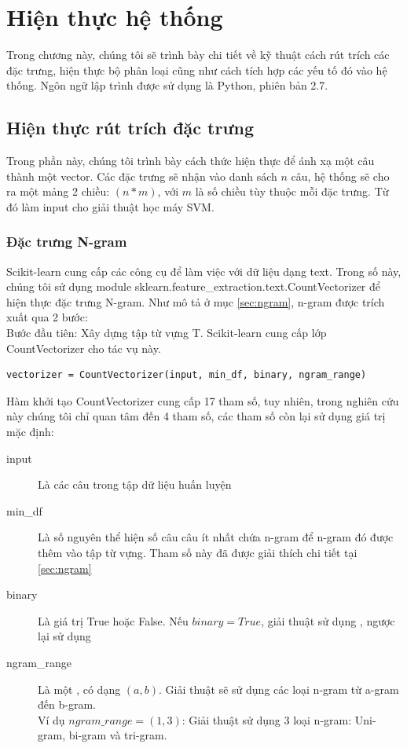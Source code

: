 \section{Hiện thực hệ thống} \label{sec:hienthuchethong}
Trong chương này, chúng tôi sẽ trình bày chi tiết về kỹ thuật cách rút trích các đặc trưng, hiện thực bộ phân loại cũng như cách tích hợp các yếu tố đó vào hệ thống. Ngôn ngữ lập trình được sử dụng là Python, phiên bản 2.7.

\subsection{Hiện thực rút trích đặc trưng}
Trong phần này, chúng tôi trình bày cách thức hiện thực để ánh xạ một câu thành một vector. Các đặc trưng sẽ nhận vào danh sách $n$ câu, hệ thống sẽ cho ra một mảng 2 chiều: $(n*m)$, với $m$ là số chiều tùy thuộc mỗi đặc trưng. Từ đó làm input cho giải thuật học máy SVM.
\subsubsection*{Đặc trưng N-gram}
Scikit-learn cung cấp các công cụ để làm việc với dữ liệu dạng text. Trong số này, chúng tôi sử dụng module sklearn.feature\_extraction.text.CountVectorizer để hiện thực đặc trưng N-gram. Như mô tả ở mục \ref{sec:ngram}, n-gram được trích xuất qua 2 bước:\\

Bước đầu tiên: Xây dựng tập từ vựng T. Scikit-learn cung cấp lớp CountVectorizer cho tác vụ này.
\begin{lstlisting}
vectorizer = CountVectorizer(input, min_df, binary, ngram_range)
\end{lstlisting}
Hàm khởi tạo CountVectorizer cung cấp 17 tham số, tuy nhiên, trong nghiên cứu này chúng tôi chỉ quan tâm đến 4 tham số, các tham số còn lại sử dụng giá trị mặc định:
\begin{description}
\item[input] Là các câu trong tập dữ liệu huấn luyện
\item[min\_df] Là số nguyên thể hiện số câu câu ít nhất chứa n-gram để n-gram đó được thêm vào tập từ vựng. Tham số này đã được giải thích chi tiết tại \ref{sec:ngram}
\item[binary] Là giá trị True hoặc False. Nếu $binary=True$, giải thuật sử dụng \footnotemark, 
ngược lại sử dụng \footnotemark
 \item[ngram\_range] Là một , có dạng $(a, b)$. Giải thuật sẽ sử dụng các loại n-gram từ a-gram đến b-gram. \\
 Ví dụ $ngram\_range = (1,3)$: Giải thuật sử dụng 3 loại n-gram: Uni-gram, bi-gram và tri-gram.
\end{description}

